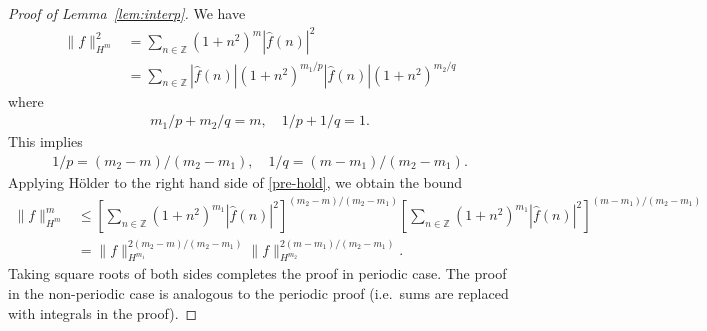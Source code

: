 \documentclass[12pt,reqno]{amsart}
\numberwithin{equation}{section}  %
\numberwithin{figure}{section}
\newcommand{\rr}{\mathbb{R}}
\newcommand{\zz}{\mathbb{Z}}
\newcommand{\wh}{\widehat}
\newcommand{\p}{\partial}
\begin{document}
%
%
\begin{proof}[Proof of Lemma~\ref{lem:interp}]
 We have
 \begin{equation}
   \label{pre-hold}
 \begin{split}
   \| f \|_{H^{m}}^{2}
   & = \sum_{n \in \zz} (1 + n^{2})^{m} | \wh{f}(n) |^{2} 
   \\
   & = \sum_{n \in \zz} | \wh{f}(n) | (1 + n^{2})^{m_{1}/p} | \wh{f}(n) |
   (1 + n^{2})^{m_{2}/q} 
 \end{split}
 \end{equation}
 where
 \begin{equation*}
 \begin{split}
   m_{1}/p + m_{2}/q =m, \quad 1/p + 1/q =1.
 \end{split}
 \end{equation*}
This implies 
 \begin{equation*}
 \begin{split}
   1/p = (m_{2} -m)/(m_{2} -m_{1}), \quad 1/q = (m -m_{1})/(m_{2} -m_{1}). 
 \end{split}
 \end{equation*}
 Applying H\"older to the right hand side of \eqref{pre-hold}, we obtain the
 bound
 \begin{equation*}
 \begin{split}
   \| f \|_{H^{m}}^{m}
   & \le  \left[ \sum_{n \in \zz} (1 + n^{2})^{m_{1}} | \wh{f}(n) |^{2} 
   \right]^{(m_{2} - m)/(m_{2} -m_{1})} \left[ \sum_{n \in \zz} (1 + n^{2})^{m_{1}}
   | \wh{f}(n) |^{2}  \right]^{(m - m_{1})/(m_{2} -m_{1})}
   \\
   & = \| f \|_{H^{m_{1}}}^{2 (m_{2} - m)/(m_{2} -m_{1})}
   \| f \|_{H^{m_{2}}}^{2 (m - m_{1})/(m_{2} -m_{1})}.
 \end{split}
 \end{equation*}
 Taking square roots of both sides completes the proof in periodic case.
 The proof in the non-periodic case is analogous to the periodic proof (i.e.\
 sums are replaced with integrals in the proof).
  \end{proof}
\end{document}
